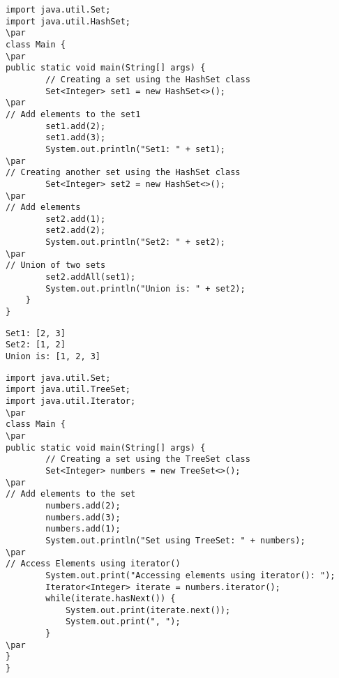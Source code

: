 \documentclass{book}
\def\lthtmlcheckvsize{\ifdim\ht\sizebox<\vsize 
  \ifdim\wd\sizebox<\hsize\expandafter\hfill\fi \expandafter\vfill
  \else\expandafter\vss\fi}%
\begin{document}
{\newpage\clearpage
{}%
\begin{lstlisting}
import java.util.Set;
import java.util.HashSet;
\par
class Main {
\par
public static void main(String[] args) {
        // Creating a set using the HashSet class
        Set<Integer> set1 = new HashSet<>();
\par
// Add elements to the set1
        set1.add(2);
        set1.add(3);
        System.out.println("Set1: " + set1);
\par
// Creating another set using the HashSet class
        Set<Integer> set2 = new HashSet<>();
\par
// Add elements
        set2.add(1);
        set2.add(2);
        System.out.println("Set2: " + set2);
\par
// Union of two sets
        set2.addAll(set1);
        System.out.println("Union is: " + set2);
    }
}
\end{lstlisting}%
\lthtmlfigureZ
\lthtmlcheckvsize\clearpage}

{\newpage\clearpage
{}%
\begin{lstlisting}
Set1: [2, 3]
Set2: [1, 2]
Union is: [1, 2, 3]
\end{lstlisting}%
\lthtmlfigureZ
\lthtmlcheckvsize\clearpage}

{\newpage\clearpage
{}%
\begin{lstlisting}
import java.util.Set;
import java.util.TreeSet;
import java.util.Iterator;
\par
class Main {
\par
public static void main(String[] args) {
        // Creating a set using the TreeSet class
        Set<Integer> numbers = new TreeSet<>();
\par
// Add elements to the set
        numbers.add(2);
        numbers.add(3);
        numbers.add(1);
        System.out.println("Set using TreeSet: " + numbers);
\par
// Access Elements using iterator()
        System.out.print("Accessing elements using iterator(): ");
        Iterator<Integer> iterate = numbers.iterator();
        while(iterate.hasNext()) {
            System.out.print(iterate.next());
            System.out.print(", ");
        }
\par
}
}
\end{lstlisting}%
\lthtmlfigureZ
\lthtmlcheckvsize\clearpage}
\end{document}

